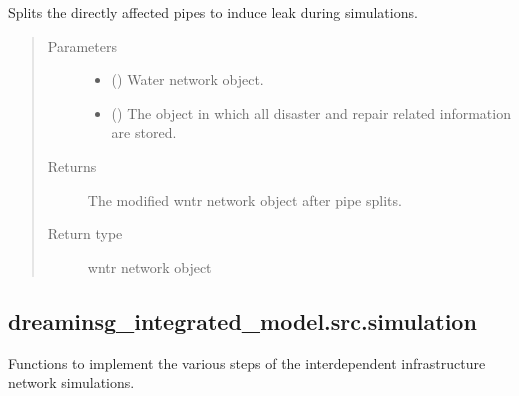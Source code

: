\documentclass[letterpaper,10pt,english]{sphinxmanual}
\begin{document}
\begin{fulllineitems}
\label{\detokenize{apidoc:dreaminsg_integrated_model.src.network_recovery.pipe_leak_node_generator}}
\sphinxAtStartPar
Splits the directly affected pipes to induce leak during simulations.
\begin{quote}\begin{description}
\item[{Parameters}] \leavevmode\begin{itemize}
\item {} 
\sphinxAtStartPar
{} () \textendash{} Water network object.

\item {} 
\sphinxAtStartPar
{} () \textendash{} The object in which all disaster and repair related information are stored.

\end{itemize}

\item[{Returns}] \leavevmode
\sphinxAtStartPar
The modified wntr network object after pipe splits.

\item[{Return type}] \leavevmode
\sphinxAtStartPar
wntr network object

\end{description}\end{quote}

\end{fulllineitems}



\subsection{dreaminsg\_integrated\_model.src.simulation}
\label{\detokenize{apidoc:module-dreaminsg_integrated_model.src.simulation}}\label{\detokenize{apidoc:dreaminsg-integrated-model-src-simulation}}
\sphinxAtStartPar
Functions to implement the various steps of the interdependent infrastructure network simulations.
\end{document}
